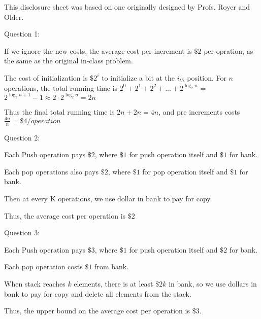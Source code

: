 \documentclass[12pt]{article}
\begin{document}

\hfill {\tiny This disclosure sheet was based on one originally designed
  by
  Profs. Royer and Older.}


\pagebreak
\noindent
\large Question 1: \vspace{5mm} \par
\normalsize 
If we ignore the new costs, the average cost per increment is $\$2 $ per opration, as the same as the original in-class problem. \par
The cost of initialization is $\$2^i$ to initialize a bit at the $i_{th}$ position. 
For $n$ operations, the total running time is $2^0 + 2^1 + 2^2 + ... + 2^{\log_{2}{n}}$ = $2^{\log_{2}{n}+1} - 1 \approx 2 \cdot 2^{\log_{2}{n}} = 2n$ \par
Thus the final total running time is $2n + 2n = 4n$, and pre increments costs $\frac{4n}{n} = \$4/operation$ 



\pagebreak
\noindent
\large Question 2: \vspace{5mm} \par
\normalsize 
Each Push operation pays $\$2$, where $\$1$ for push operation itself and $\$1$ for bank. \par
Each pop operations also pays $\$2$, where $\$1$ for pop operation itself and $\$1$ for bank. \par
Then at every K operations, we use dollar in bank to pay for copy. \par
Thus, the average cost per operation is $\$2$ 




\pagebreak
\noindent
\large Question 3: \vspace{5mm} \par
\normalsize 
Each Push operation pays $\$3$, where $\$1$ for push operation itself and $\$2$ for bank. \par
Each pop operation costs $\$1$ from bank. \par
When stack reaches $k$ elements, there is at least $\$2k$ in bank, so we use dollars in bank to pay for copy and delete all elements from the stack. \par
Thus, the upper bound on the average cost per operation is $\$3$. 
\end{document}
